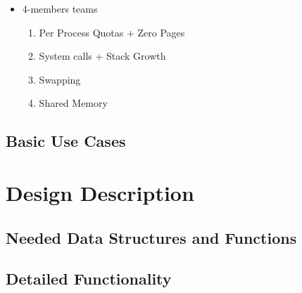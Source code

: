\begin{itemize}
    \item 4-members teams
        \begin{enumerate}
            \item Per Process Quotas + Zero Pages
            \item System calls + Stack Growth
            \item Swapping
            \item Shared Memory
        \end{enumerate}
\end{itemize}

\subsection{Basic Use Cases}


\section{Design Description}

\subsection{Needed Data Structures and Functions}



\subsection{Detailed Functionality}

